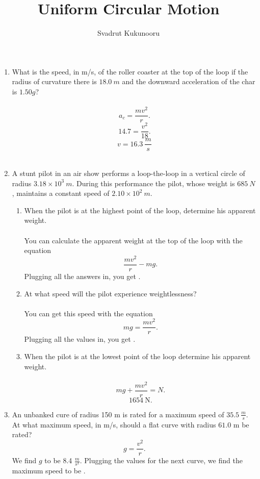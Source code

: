 \documentclass[a4paper]{report}
\title{Uniform Circular Motion}
\author{Svadrut Kukunooru}
\begin{document}
    \maketitle
    \begin{enumerate}
        \item What is the speed, in m/s, of the roller coaster at the top of the loop if the radius of curvature there is $18.0\ m$ and the downward acceleration of the char is $1.50g$? \\ \\
             \[
            a_c = \frac{mv^2}{r}
            .\] 
            \[
            14.7 = \frac{v^2}{18}
            .\] 
            \begin{equation}
                \boxed{v = 16.3\ \frac{m}{s}}
            \end{equation} \\ 
        \item A stunt pilot in an air show performs a loop-the-loop in a vertical circle of radius $3.18\times 10^3\ m$. During this performance the pilot, whose weight is $685\ N$, maintains a constant speed of  $2.10\times 10^2\ m$.
            \begin{enumerate}
                \item When the pilot is at the highest point of the loop, determine his apparent weight. \\ \\ 
                You can calculate the apparent weight at the top of the loop with the equation
                \[
                \frac{mv^2}{r} - mg
                .\] 
                Plugging all the answers in, you get . 
                \item At what speed will the pilot experience weightlessness? \\ \\ 
                You can get this speed with the equation
                \[
                mg = \frac{mv^2}{r}
                .\] 
                Plugging all the values in, you get . 
                \item When the pilot is at the lowest point of the loop determine his apparent weight. \\ \\ 
                \[
                mg + \frac{mv^2}{r} = N
                .\] 
                \begin{equation}
                    \boxed{1654\ \text{N}}.
                \end{equation}
                    
            \end{enumerate}
            \item An unbanked cure of radius 150 m is rated for a maximum speed of $35.5\ \frac{m}{s}$. At what maximum speed, in m/s, should a flat curve with radius $61.0$ m be rated?
            \[
            g = \frac{v^2}{r}
            .\] 
            We find $g$ to be 8.4 $\frac{m}{s^2}$. Plugging the values for the next curve, we find the maximum speed to be . 
    \end{enumerate}
\end{document}
